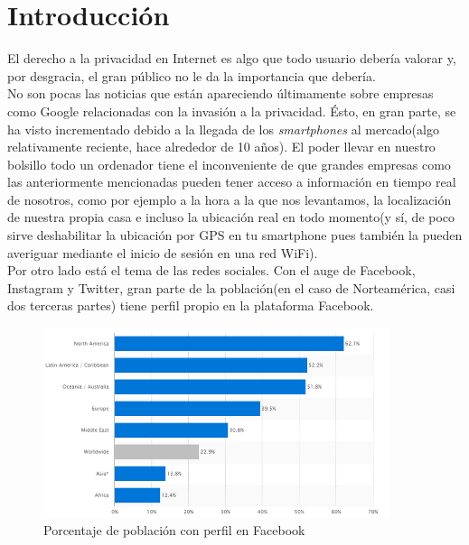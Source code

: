 \chapter{Introducción} 
\label{chap:intro}
\vspace{-0.2cm}


El derecho a la privacidad en Internet es algo que todo usuario debería valorar y, por desgracia, el gran público no le da la importancia que debería.\\

No son pocas las noticias que están apareciendo últimamente sobre empresas como Google relacionadas con la invasión a la privacidad. Ésto, en gran parte, se ha visto incrementado debido a la llegada de los \textit{smartphones} al mercado(algo relativamente reciente, hace alrededor de 10 años). El poder llevar en nuestro bolsillo todo un ordenador tiene el inconveniente de que grandes empresas como las anteriormente mencionadas pueden tener acceso a información en tiempo real de nosotros, como por ejemplo a la hora a la que nos levantamos, la localización de nuestra propia casa e incluso la ubicación real en todo momento(y sí, de poco sirve deshabilitar la ubicación por GPS en tu smartphone pues también la pueden averiguar mediante el inicio de sesión en una red WiFi).\\
Por otro lado está el tema de las redes sociales. Con el auge de Facebook, Instagram y Twitter, gran parte de la población(en el caso de Norteamérica, casi dos terceras partes) tiene perfil propio en la plataforma Facebook.

\begin{figure}[h]
	\centerline{
		\mbox{\includegraphics[width=4.00in]{images/sn.png}}
	}
	\caption{Porcentaje de población con perfil en Facebook}
	\label{fig:norm_Daugman}
\end{figure}

